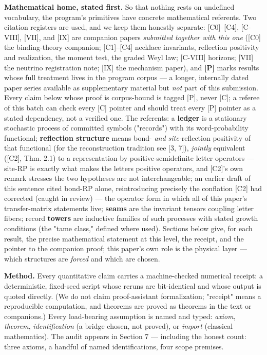 \documentclass[11pt]{article}
\begin{document}
\textbf{Mathematical home, stated first.}  So that nothing rests on undefined vocabulary, the program's primitives have concrete mathematical referents.  Two citation registers are used, and we keep them honestly separate: [C0]–[C4], [C-VIII], [VII], and [IX] are companion papers \emph{submitted together with this one} ([C0] the binding-theory companion; [C1]–[C4] necklace invariants, reflection positivity and realization, the moment test, the graded Weyl law; [C-VIII] horizons; [VII] the neutrino registration note; [IX] the mechanism paper), and \textbf{[P]} marks results whose full treatment lives in the program corpus — a longer, internally dated paper series available as supplementary material but \emph{not} part of this submission.  Every claim below whose proof is corpus-bound is tagged [P], never [C]; a referee of this batch can check every [C] pointer and should treat every [P] pointer as a stated dependency, not a verified one.  The referents: a \textbf{ledger} is a stationary stochastic process of committed symbols ("records") with its word-probability functional; \textbf{reflection structure} means bond- \emph{and site-}reflection positivity of that functional (for the reconstruction tradition see [3, 7]), \emph{jointly} equivalent ([C2], Thm. 2.1) to a representation by positive-semidefinite letter operators — site-RP is exactly what makes the letters positive operators, and [C2]'s own remark stresses the two hypotheses are not interchangeable; an earlier draft of this sentence cited bond-RP alone, reintroducing precisely the conflation [C2] had corrected (caught in review) — the operator form in which all of this paper's transfer-matrix statements live; \textbf{seams} are the invariant tensors coupling letter fibers; record \textbf{towers} are inductive families of such processes with stated growth conditions (the "tame class," defined where used).  Sections below give, for each result, the precise mathematical statement at this level, the receipt, and the pointer to the companion proof; this paper's own role is the physical layer — which structures are \emph{forced} and which are chosen.

\textbf{Method.}  Every quantitative claim carries a machine-checked numerical receipt: a deterministic, fixed-seed script whose reruns are bit-identical and whose output is quoted directly.  (We do not claim proof-assistant formalization; "receipt" means a reproducible computation, and theorems are proved as theorems in the text or companions.)  Every load-bearing assumption is named and typed: \emph{axiom}, \emph{theorem}, \emph{identification} (a bridge chosen, not proved), or \emph{import} (classical mathematics).  The audit appears in Section 7 — including the honest count: three axioms, a handful of named identifications, four scope premises.
\end{document}
